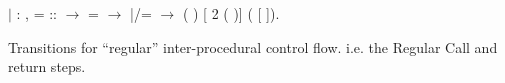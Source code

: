 \documentclass[12pt]{report}
\begin{document}
           
\begin{coqdoccode}
\coqdocindent{3.00em}
\ensuremath{|}  : \coqdockw{\ensuremath{\forall}}         ,\coqdoceol
\coqdocindent{5.00em}
 =   ::  \ensuremath{\rightarrow}\coqdoceol
\coqdocindent{5.00em}
   =   \ensuremath{\rightarrow}\coqdoceol
\coqdocindent{5.00em}
 |/=  \ensuremath{\rightarrow}\coqdoceol
\coqdocindent{5.00em}
 \coqdoceol
\coqdocindent{6.00em}
(      ) [ 2 ( )]\coqdoceol
\coqdocindent{6.00em}
(  [ ]).\coqdoceol
\coqdocemptyline
\end{coqdoccode}
Transitions for ``regular'' inter-procedural control flow.
        i.e. the Regular Call and return steps.
\end{document}
